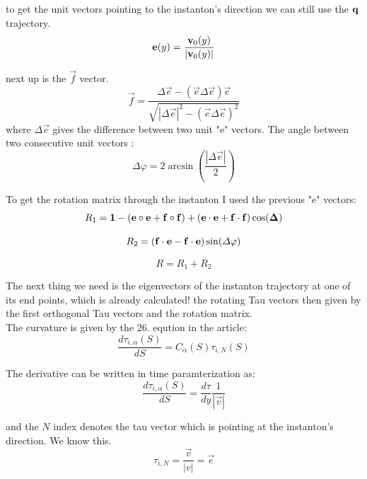\documentclass[12pt,a4paper]{article}
\numberwithin{equation}{section}
\begin{document}
to get the unit vectors pointing to the instanton's direction we can still use the ${\bf{q}}$ trajectory.
\begin{equation}
{\bf{e}}(y) = \frac{{\bf{v}}_0 (y)}{|{\bf{v}}_0 (y)|}
\end{equation}

next up is the $\vec{f}$ vector. 
\begin{equation}
\vec{f} = \frac{\Delta \vec{e} - (\vec{e}\Delta \vec{e}) \vec{e}}{\sqrt{|\Delta \vec{e}|^2 - (\vec{e}\Delta\vec{e})^2}}
\end{equation}
where $\Delta\vec{e}$ gives the difference between two unit "e" vectors. The angle between two consecutive unit vectors :
\begin{equation}
\Delta\varphi = 2 \arcsin\left( \frac{|\Delta\vec{e}|}{2}  \right)
\end{equation}

To get the rotation matrix through the instanton I used the previous "e" vectors:
\begin{equation}
R_1 = {\bf{1}} - (\bf{e} \circ \bf{e} + \bf{f} \circ \bf{f}) + (\bf{e}\cdot\bf{e} + \bf{f}\cdot\bf{f})\cos(\Delta  )
\end{equation}

\begin{equation}
R_2 = ({\bf{f}}\cdot{\bf{e}} - {\bf{f}}\cdot{\bf{e}})\sin(\Delta \varphi)
\end{equation}

\begin{equation}
R = R_1 + R_2
\end{equation}

The next thing we need is the eigenvectors of the instanton trajectory at one of its end points, which is already calculated! the rotating Tau vectors then given by the first orthogonal Tau vectors and the rotation matrix.\\

The curvature is given by the 26. eqution in the article:
\begin{equation}
\frac{d \tau_{i,\alpha} (S)}{dS} = C_\alpha (S) \tau_{i,N}(S)
\end{equation}

The derivative can be written in time paramterization as:
\begin{equation}
\frac{d \tau_{i,\alpha} (S)}{dS}  = \frac{d\tau}{dy} \frac{1}{|\vec{v}|}
\end{equation}

and the $N$ index denotes the tau vector which is pointing at the instanton's direction. We know this.
\begin{equation}
\tau_{i,N} = \frac{\vec{v}}{|v|} = \vec{e}
\end{equation}
\end{document}
